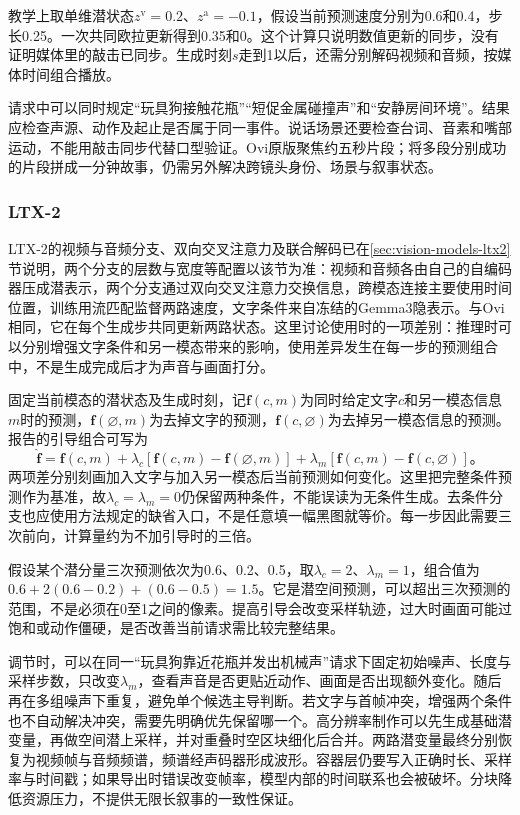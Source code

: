 教学上取单维潜状态$z^{\mathrm v}=0.2$、$z^{\mathrm a}=-0.1$，假设当前预测速度分别为0.6和0.4，步长0.25。一次共同欧拉更新得到0.35和0。这个计算只说明数值更新的同步，没有证明媒体里的敲击已同步。生成时刻$s$走到1以后，还需分别解码视频和音频，按媒体时间组合播放。

请求中可以同时规定“玩具狗接触花瓶”“短促金属碰撞声”和“安静房间环境”。结果应检查声源、动作及起止是否属于同一事件。说话场景还要检查台词、音素和嘴部运动，不能用敲击同步代替口型验证。Ovi原版聚焦约五秒片段；将多段分别成功的片段拼成一分钟故事，仍需另外解决跨镜头身份、场景与叙事状态。

\subsubsection{LTX-2}
\label{sec:vision-multigen-ltx}

LTX-2的视频与音频分支、双向交叉注意力及联合解码已在\ref{sec:vision-models-ltx2}节说明，两个分支的层数与宽度等配置以该节为准：视频和音频各由自己的自编码器压成潜表示，两个分支通过双向交叉注意力交换信息，跨模态连接主要使用时间位置，训练用流匹配监督两路速度，文字条件来自冻结的Gemma3隐表示。与Ovi相同，它在每个生成步共同更新两路状态。这里讨论使用时的一项差别：推理时可以分别增强文字条件和另一模态带来的影响，使用差异发生在每一步的预测组合中，不是生成完成后才为声音与画面打分。

固定当前模态的潜状态及生成时刻，记$\bm f(c,m)$为同时给定文字$c$和另一模态信息$m$时的预测，$\bm f(\varnothing,m)$为去掉文字的预测，$\bm f(c,\varnothing)$为去掉另一模态信息的预测。报告的引导组合可写为
\begin{equation}
 \widehat{\bm f}
 =\bm f(c,m)
  +\lambda_c[\bm f(c,m)-\bm f(\varnothing,m)]
  +\lambda_m[\bm f(c,m)-\bm f(c,\varnothing)]\text{。}
 \label{eq:vision-modality-guidance}
\end{equation}
两项差分别刻画加入文字与加入另一模态后当前预测如何变化。这里把完整条件预测作为基准，故$\lambda_c=\lambda_m=0$仍保留两种条件，不能误读为无条件生成。去条件分支也应使用方法规定的缺省入口，不是任意填一幅黑图就等价。每一步因此需要三次前向，计算量约为不加引导时的三倍。

假设某个潜分量三次预测依次为0.6、0.2、0.5，取$\lambda_c=2$、$\lambda_m=1$，组合值为$0.6+2(0.6-0.2)+(0.6-0.5)=1.5$。它是潜空间预测，可以超出三次预测的范围，不是必须在0至1之间的像素。提高引导会改变采样轨迹，过大时画面可能过饱和或动作僵硬，是否改善当前请求需比较完整结果。

调节时，可以在同一“玩具狗靠近花瓶并发出机械声”请求下固定初始噪声、长度与采样步数，只改变$\lambda_m$，查看声音是否更贴近动作、画面是否出现额外变化。随后再在多组噪声下重复，避免单个候选主导判断。若文字与首帧冲突，增强两个条件也不自动解决冲突，需要先明确优先保留哪一个。高分辨率制作可以先生成基础潜变量，再做空间潜上采样，并对重叠时空区块细化后合并。两路潜变量最终分别恢复为视频帧与音频频谱，频谱经声码器形成波形。容器层仍要写入正确时长、采样率与时间戳；如果导出时错误改变帧率，模型内部的时间联系也会被破坏。分块降低资源压力，不提供无限长叙事的一致性保证。

